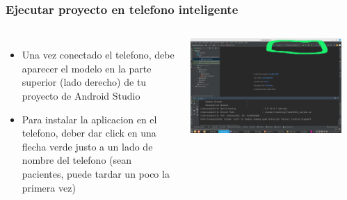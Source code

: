\begin{frame}
\frametitle{Ejecutar proyecto en telefono inteligente} 
\begin{columns}

\begin{itemize}
\item Una vez conectado el telefono, debe aparecer el modelo en la parte superior (lado derecho) de tu proyecto de Android Studio
\item Para instalar la aplicacion en el telefono, deber dar click en una flecha verde justo a un lado de nombre del telefono (sean pacientes, puede tardar un poco la primera vez)
\end{itemize}
\begin{center}
\includegraphics[width=0.65\linewidth]{01_Configurar/AndroidStudio_SmartphoneReconocido.png}    
\end{center}
\begin{center}

\end{center}
\end{columns}
\end{frame}
